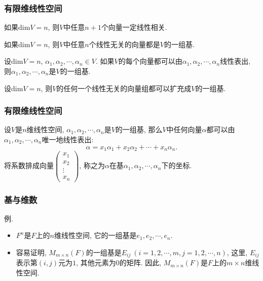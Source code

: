 \documentclass[CJK]{beamer}
\begin{document}
\begin{frame}
	\frametitle{有限维线性空间} \pause
	\begin{theorem}
	   如果$\mathrm{dim}V=n$, 则$V$中任意$n+1$个向量一定线性相关.
	\end{theorem}\pause
	
	\begin{theorem}
		如果$\mathrm{dim}V=n$, 则$V$中任意$n$个线性无关的向量都是$V$的一组基.
	\end{theorem}\pause

\begin{theorem}
	设$\mathrm{dim}V=n$, $\alpha_{1}, \alpha_{2}, \cdots, \alpha_{n}\in V$. 如果$V$的每个向量都可以由$\alpha_{1}, \alpha_{2}, \cdots, \alpha_{n}$线性表出, 则$\alpha_{1}, \alpha_{2}, \cdots, \alpha_{n}$是$V$的一组基.
\end{theorem}\pause

\begin{theorem}
	设$\mathrm{dim}V=n$, 则$V$的任何一个线性无关的向量组都可以扩充成$V$的一组基.
\end{theorem}
\end{frame}

\begin{frame}
	\frametitle{有限维线性空间}
	设$V$是$n$维线性空间, $\alpha_{1}, \alpha_{2}, \cdots, \alpha_{n}$是$V$的一组基, 那么$V$中任何向量$\alpha$都可以由$\alpha_{1}, \alpha_{2}, \cdots, \alpha_{n}$唯一地线性表出:
	\[\alpha=x_{1}\alpha_{1}+x_{2}\alpha_{2}+\cdots+x_{n}\alpha_{n}.\]
	将系数排成向量$\begin{pmatrix}
		x_{1}\\x_{2}\\\vdots\\x_{n}
	\end{pmatrix}$, 称之为$\alpha$在基$\alpha_{1}, \alpha_{2}, \cdots, \alpha_{n}$下的坐标.
\end{frame}

\begin{frame}
	\frametitle{基与维数} 
例. \pause \begin{itemize}
	\item $F^{n}$是$F$上的$n$维线性空间, 它的一组基是$e_{1}, e_{2}, \cdots, e_{n}$.\pause
	
	\item 容易证明, $M_{m\times n}(F)$的一组基是$E_{ij}\ (i=1, 2, \cdots, m, j=1, 2, \cdots, n)$, 这里, $E_{ij}$表示第$(i, j)$元为$1$, 其他元素为$0$的矩阵. 因此, $M_{m\times n}(F)$是$F$上的$m\times n$维线性空间.
\end{itemize}
\end{frame}
	
\end{document}
